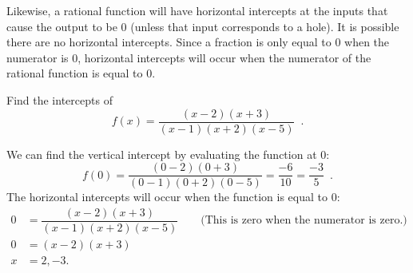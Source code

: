 Likewise, a rational function will have horizontal intercepts at the inputs that cause the output to be 0 (unless that input corresponds to a hole). It is possible there are no horizontal intercepts. Since a fraction is only equal to 0 when the numerator is 0, horizontal intercepts will occur when the numerator of the rational function is equal to 0.

\begin{example}
Find the intercepts of
$$f(x)=\dfrac{(x-2)(x+3)}{(x-1)(x+2)(x-5)} \enspace .$$
\begin{solution} We can find the vertical intercept by evaluating the function at 0:
$$f(0)=\dfrac{(0-2)(0+3)}{(0-1)(0+2)(0-5)}=\dfrac{-6}{10}=\dfrac{-3}{5} \enspace .$$
The horizontal intercepts will occur when the function is equal to 0:
\begin{align*}
		0 &= \dfrac{(x-2)(x+3)}{(x-1)(x+2)(x-5)} \qquad \text{(This is zero when the numerator is zero.)}\\
		0 &= (x-2)(x+3)\\
		x &= 2, -3.
\end{align*}
\end{solution}\end{example}

